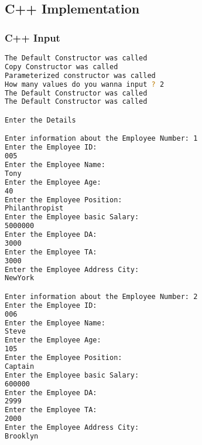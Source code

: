 \documentclass[11pt]{article}
\begin{document}
\subsection{C++ Implementation}



\subsubsection{C++ Input}
\begin{lstlisting}[language=bash, caption=C++ Input]
The Default Constructor was called
Copy Constructor was called
Parameterized constructor was called
How many values do you wanna input ? 2
The Default Constructor was called
The Default Constructor was called

Enter the Details

Enter information about the Employee Number: 1
Enter the Employee ID:
005
Enter the Employee Name:
Tony
Enter the Employee Age:
40
Enter the Employee Position:
Philanthropist
Enter the Employee basic Salary:
5000000
Enter the Employee DA:
3000
Enter the Employee TA:
3000
Enter the Employee Address City:
NewYork

Enter information about the Employee Number: 2
Enter the Employee ID:
006
Enter the Employee Name:
Steve
Enter the Employee Age:
105
Enter the Employee Position:
Captain
Enter the Employee basic Salary:
600000
Enter the Employee DA:
2999
Enter the Employee TA:
2000
Enter the Employee Address City:
Brooklyn

\end{lstlisting}
\end{document}

